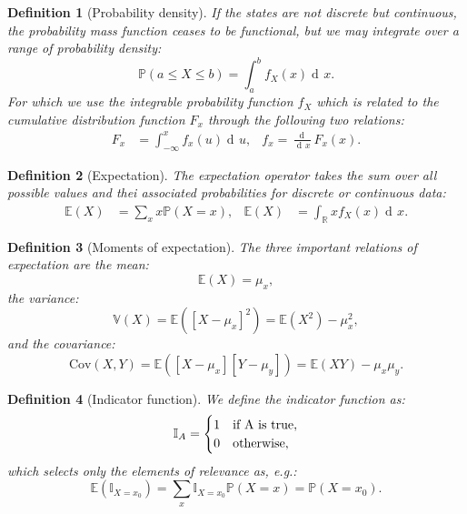 \documentclass{article}
\newtheorem{definition}{Definition}
\DeclareMathOperator{\di}{d\!}
\begin{document}
\begin{definition}[Probability density]
    If the states are not discrete but continuous, the probability mass function ceases to be functional, but we may integrate over a range of probability density:
    \begin{equation}
        \mathbb{P}(a\leq X \leq b) = \int_{a}^b f_X(x)\di x.
    \end{equation}
    For which we use the integrable probability function $f_X$ which is related to the cumulative distribution function $F_x$ through the following two relations:
    \begin{align}
        F_x &= \int_{-\infty}^x f_x(u)\di u,& f_x = \frac{\di}{\di x}F_x(x).
    \end{align}
\end{definition}
\begin{definition}[Expectation]
    The expectation operator takes the sum over all possible values and thei associated probabilities for discrete or continuous data:
    \begin{align}
        \mathbb{E}(X) &= \sum_x x\mathbb{P}(X=x),& \mathbb{E}(X) &=\int_\mathbb{R} x f_X(x)\di x.
    \end{align}
\end{definition}
\begin{definition}[Moments of expectation]
    The three important relations of expectation are the mean:
    \begin{equation}
        \mathbb{E}(X) = \mu_x,
    \end{equation}
    the variance:
    \begin{equation}
        \mathbb{V}(X)=\mathbb{E}([X-\mu_x]^2) = \mathbb{E}(X^2) - \mu_x^2,
    \end{equation}
    and the covariance:
    \begin{equation}
        \text{Cov}(X,Y)=\mathbb{E}([X-\mu_x][Y-\mu_y]) = \mathbb{E}(XY)-\mu_x\mu_y.
    \end{equation}
\end{definition}
\begin{definition}[Indicator function]
    We define the indicator function as:
    \begin{equation}
        \mathbb{I}_A = \begin{cases} 1 & \text{if}\ $A$\text{ is true},\\ 0 & \text{otherwise}, \end{cases}
    \end{equation}
    which selects only the elements of relevance as, e.g.:
    \begin{equation}
        \mathbb{E}(\mathbb{I}_{X=x_0})=\sum_x \mathbb{I}_{X=x_0}\mathbb{P}(X=x) = \mathbb{P}(X=x_0). 
    \end{equation}
\end{definition}
\end{document}
